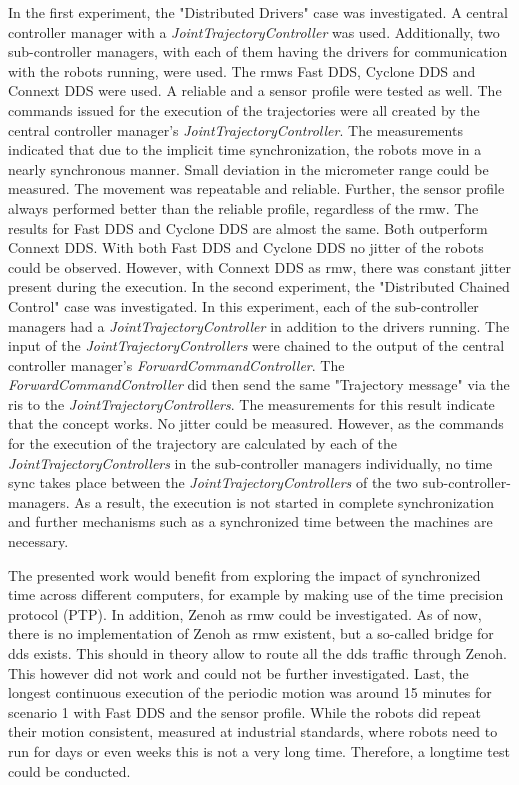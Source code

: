 In the first experiment, the "Distributed Drivers" case was investigated. A central controller manager with a \textit{JointTrajectoryController} was used. Additionally, two sub-controller managers, with each of them having the drivers for communication with the robots running, were used. The \glspl{rmw} Fast DDS, Cyclone DDS and Connext DDS were used. A reliable and a sensor profile were tested as well. The commands issued for the execution of the trajectories were all created by the central controller manager's \textit{JointTrajectoryController}. The measurements indicated that due to the implicit time synchronization, the robots move in a nearly synchronous manner. Small deviation in the micrometer range could be measured. The movement was repeatable and reliable. Further, the sensor profile always performed better than the reliable profile, regardless of the \gls{rmw}. The results for Fast DDS and Cyclone DDS are almost the same. Both outperform Connext DDS. With both Fast DDS and Cyclone DDS no jitter of the robots could be observed. However, with Connext DDS as \gls{rmw}, there was constant jitter present during the execution.\newline
In the second experiment, the "Distributed Chained Control" case was investigated. In this experiment, each of the sub-controller managers had a \textit{JointTrajectoryController} in addition to the drivers running. The input of the \textit{JointTrajectoryControllers} were chained to the output of the central controller manager's \textit{ForwardCommandController}. The \textit{ForwardCommandController} did then send the same  "Trajectory message" via the \glspl{ri} to the \textit{JointTrajectoryControllers}. The measurements for this result indicate that the concept works. No jitter could be measured. However, as the commands for the execution of the trajectory are calculated by each of the \textit{JointTrajectoryControllers} in the sub-controller managers individually, no time sync takes place between the \textit{JointTrajectoryControllers} of the two sub-controller-managers. As a result, the execution is not started in complete synchronization and further mechanisms such as a synchronized time between the machines are necessary.

The presented work would benefit from exploring the impact of synchronized time across different computers, for example by making use of the time precision protocol (PTP). In addition, Zenoh as \gls{rmw} could be investigated. As of now, there is no implementation of Zenoh as \gls{rmw} existent, but a so-called bridge for \gls{dds} exists. This should in theory allow to route all the \gls{dds} traffic through Zenoh. This however did not work and could not be further investigated. Last, the longest continuous execution of the periodic motion was around 15 minutes for scenario 1 with Fast DDS and the sensor profile. While the robots did repeat their motion consistent, measured at industrial standards, where robots need to run for days or even weeks this is not a very long time. Therefore, a longtime test could be conducted.